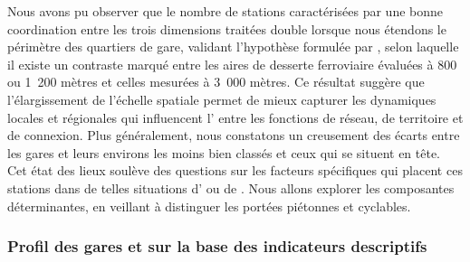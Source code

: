 \begin{refsegment}
Nous avons pu observer que le nombre de stations caractérisées par une bonne coordination entre les trois dimensions traitées double lorsque nous étendons le périmètre des quartiers de gare, validant l'hypothèse formulée par \textcolor{blue}{\textcite[518]{caset_measuring_2018}}, selon laquelle il existe un contraste marqué entre les aires de desserte ferroviaire évaluées à 800 ou 1~200 mètres et celles mesurées à 3~000 mètres. Ce résultat suggère que l'élargissement de l'échelle spatiale permet de mieux capturer les dynamiques locales et régionales qui influencent l' entre les fonctions de réseau, de territoire et de connexion. Plus généralement, nous constatons un creusement des écarts entre les gares et leurs environs les moins bien classés et ceux qui se situent en tête. Cet état des lieux soulève des questions sur les facteurs spécifiques qui placent ces stations dans de telles situations d' ou de . Nous allons explorer les composantes déterminantes, en veillant à distinguer les portées piétonnes et cyclables.%

\subsubsection*{Profil des gares  et  sur la base des indicateurs descriptifs
    \label{chap6:results-profil-gares-dependance}
    }


\end{refsegment}
